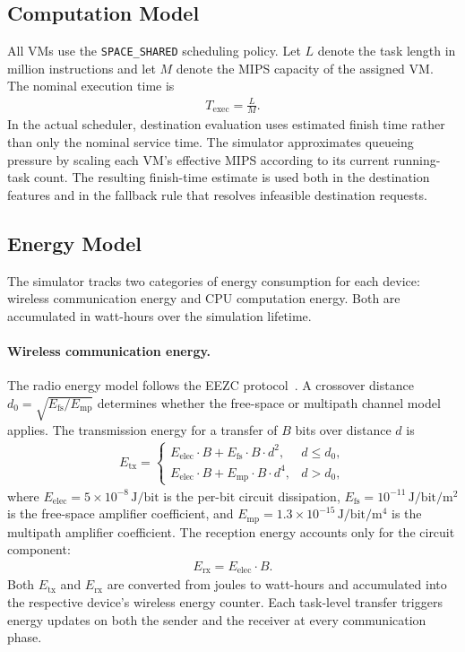 \subsection{Computation Model}
\label{subsec:computation-model}

All VMs use the \texttt{SPACE\_SHARED} scheduling policy. Let \(L\) denote the task length in million instructions and let \(M\) denote the MIPS capacity of the assigned VM. The nominal execution time is
\begin{align}
T_{\mathrm{exec}} = \frac{L}{M}.
\label{eq:exec-time}
\end{align}
In the actual scheduler, destination evaluation uses estimated finish time rather than only the nominal service time. The simulator approximates queueing pressure by scaling each VM's effective MIPS according to its current running-task count. The resulting finish-time estimate is used both in the destination features and in the fallback rule that resolves infeasible destination requests.

\subsection{Energy Model}
\label{subsec:energy-model}

The simulator tracks two categories of energy consumption for each device: wireless communication energy and CPU computation energy. Both are accumulated in watt-hours over the simulation lifetime.

\paragraph{Wireless communication energy.}
The radio energy model follows the EEZC protocol~\cite{abidi2017eezc}. A crossover distance \(d_0 = \sqrt{E_{\mathrm{fs}} / E_{\mathrm{mp}}}\) determines whether the free-space or multipath channel model applies. The transmission energy for a transfer of \(B\) bits over distance \(d\) is
\begin{align}
E_{\mathrm{tx}} =
\begin{cases}
E_{\mathrm{elec}} \cdot B + E_{\mathrm{fs}} \cdot B \cdot d^{2}, & d \le d_0, \\
E_{\mathrm{elec}} \cdot B + E_{\mathrm{mp}} \cdot B \cdot d^{4}, & d > d_0,
\end{cases}
\label{eq:energy-tx}
\end{align}
where \(E_{\mathrm{elec}} = 5 \times 10^{-8}\,\mathrm{J/bit}\) is the per-bit circuit dissipation, \(E_{\mathrm{fs}} = 10^{-11}\,\mathrm{J/bit/m^2}\) is the free-space amplifier coefficient, and \(E_{\mathrm{mp}} = 1.3 \times 10^{-15}\,\mathrm{J/bit/m^4}\) is the multipath amplifier coefficient. The reception energy accounts only for the circuit component:
\begin{align}
E_{\mathrm{rx}} = E_{\mathrm{elec}} \cdot B.
\label{eq:energy-rx}
\end{align}
Both \(E_{\mathrm{tx}}\) and \(E_{\mathrm{rx}}\) are converted from joules to watt-hours and accumulated into the respective device's wireless energy counter. Each task-level transfer triggers energy updates on both the sender and the receiver at every communication phase.

